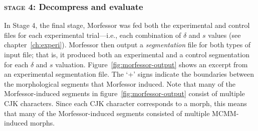 { 
\subsubsection{\textsc{stage 4:} Decompress and evaluate}
 In Stage 4, the final stage, 
 Morfessor was fed both the experimental and control files for each experimental trial---i.e.,
 each combination of $\delta$ and $s$ values (see chapter~\ref{ch:experi}).
Morfessor then output a \textit{segmentation} file for both types of input file; that is, it
produced both an experimental and a control segmentation for 
each $\delta$ and $s$ valuation. 
Figure~\ref{fig:morfessor-output} 
shows an excerpt from an 
experimental segmentation file. The `+' signs indicate 
the boundaries between the morphological segments that Morfessor induced. 
Note that many of the
Morfessor-induced segments in figure~\ref{fig:morfessor-output} consist of multiple 
CJK characters. Since each CJK character corresponds to a morph, 
this means that many of the Morfessor-induced segments consisted of multiple
MCMM-induced morphs.

}
